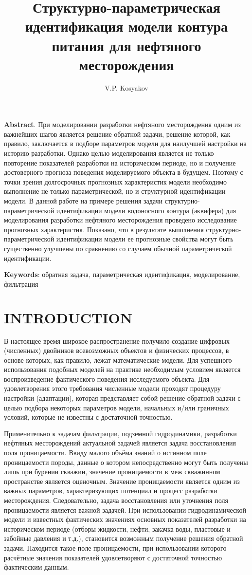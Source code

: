 \documentclass{article}
\title{Структурно-параметрическая идентификация модели контура питания для нефтяного месторождения}
\author{V.P. Kosyakov}
\begin{document}
	\maketitle
	\textbf{Abstract}. При моделировании разработки нефтяного месторождения одним из важнейших шагов является решение обратной задачи, решение которой, как правило, заключается в подборе параметров модели для наилучшей настройки на историю разработки. Однако целью моделирования является не только повторение показателей разработки на историческом периоде, но и получение достоверного прогноза поведения моделируемого объекта в будущем. Поэтому с точки зрения долгосрочных прогнозных характеристик модели необходимо выполнение не только параметрической, но и структурной идентификации модели.
В данной работе на примере решения задачи структурно-параметрической идентификации модели водоносного контура (аквифера) для моделирования разработки нефтяного месторождения проведено исследование прогнозных характеристик. Показано, что в результате выполнения структурно-параметрической идентификации модели ее прогнозные свойства могут быть существенно улучшены по сравнению со случаем обычной параметрической идентификации. 

\textbf{Keywords}: обратная задача, параметрическая идентификация, моделирование, фильтрация

\section{INTRODUCTION}
	В настоящее время широкое распространение получило создание цифровых (численных) двойников всевозможных объектов и физических процессов, в основе которых, как правило, лежат математические модели. Для успешного использования подобных моделей на практике необходимым условием является воспроизведение фактического поведения исследуемого объекта. Для удовлетворения этого требования численные модели проходят процедуру настройки (адаптации), которая представляет собой решение обратной задачи с целью подбора некоторых параметров модели, начальных и/или граничных условий, которые не известны с достаточной точностью. 
	
	Применительно к задачам фильтрации, подземной гидродинамики, разработки нефтяных месторождений актуальной задачей является задача восстановления поля проницаемости. Ввиду малого объёма знаний о истинном поле проницаемости породы, данные о котором непосредственно могут быть получены лишь при бурении скважин, значение проницаемости в меж скважинном пространстве является оценочным. Значение проницаемости является одним из  важных параметров, характеризующих потенциал и процесс разработки месторождения. Следовательно, задача восстановления или уточнения поля проницаемости является важной задачей. При использовании гидродинамической модели и известных фактических значениях основных показателей разработки на историческом периоде (отборы жидкости, нефти, закачка воды, пластовые и забойные давления и т.д.), становится возможным получение решения обратной задачи. Находится такое поле проницаемости, при использовании которого расчётные значения показателей удовлетворяют с достаточной точностью фактическим данным.
	
\end{document}
